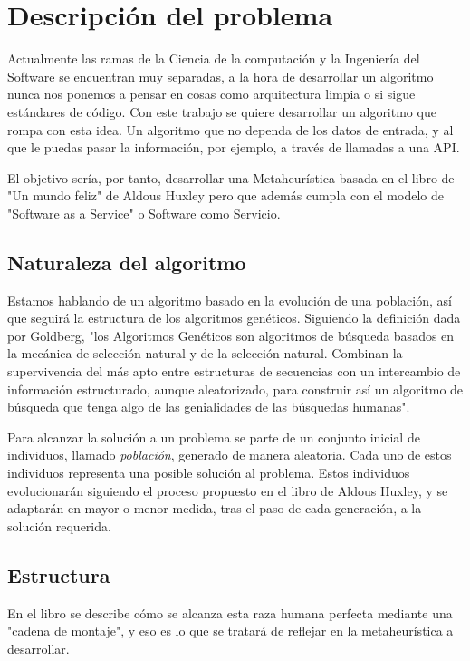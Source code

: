 \chapter{Descripción del problema}

Actualmente las ramas de la Ciencia de la computación y la Ingeniería del Software se encuentran muy separadas, a la
hora de desarrollar un algoritmo nunca nos ponemos a pensar en cosas como arquitectura limpia o si sigue estándares
de código. Con este trabajo se quiere desarrollar un algoritmo que rompa con esta idea. Un algoritmo que no dependa
de los datos de entrada, y al que le puedas pasar la información, por ejemplo, a través de llamadas a una API.

El objetivo sería, por tanto, desarrollar una Metaheurística basada en el libro de "Un mundo feliz" de Aldous
Huxley pero que además cumpla con el modelo de "Software as a Service" o Software como Servicio.

\section{Naturaleza del algoritmo}

Estamos hablando de un algoritmo basado en la evolución de una población, así que seguirá la estructura de los
algoritmos genéticos. Siguiendo la definición dada por Goldberg, "los Algoritmos Genéticos son algoritmos de búsqueda
basados en la mecánica de selección natural y de la selección natural. Combinan la supervivencia del más apto entre estructuras
de secuencias con un intercambio de información estructurado, aunque aleatorizado, para construir así un algoritmo
de búsqueda que tenga algo de las genialidades de las búsquedas humanas"\cite{goldberg89}.

Para alcanzar la solución a un problema se parte de un conjunto inicial de individuos, llamado \textit{población},
generado de manera aleatoria. Cada uno de estos individuos representa una posible solución al problema. Estos individuos
evolucionarán siguiendo el proceso propuesto en el libro de Aldous Huxley, y se adaptarán en mayor o menor medida,
tras el paso de cada generación, a la solución requerida.

\section{Estructura}

En el libro se describe cómo se alcanza esta raza humana perfecta mediante una "cadena de montaje", y eso es lo que se
tratará de reflejar en la metaheurística a desarrollar.

